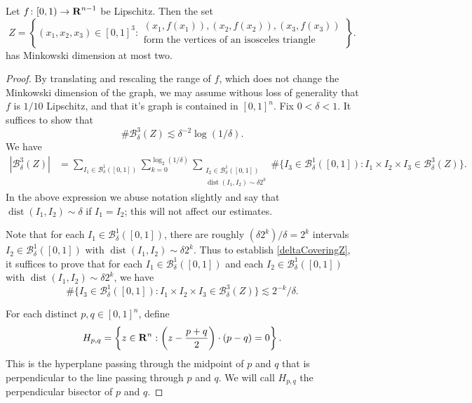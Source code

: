 \begin{lemma}
	Let $f\colon [0,1) \to \operatorname{\mathbf{R}}^{n-1}$ be Lipschitz. Then the set
	\[ Z = \left\{ (x_1,x_2,x_3) \in [0,1]^3 : \begin{array}{c} (x_1,f(x_1)), (x_2,f(x_2)), (x_3,f(x_3))\\
		\textrm{form the vertices of an isosceles triangle} \end{array} \right\}. \]
	has Minkowski dimension at most two.
\end{lemma}
\begin{proof}
By translating and rescaling the range of $f$, which does not change the Minkowski dimension of the graph, we may assume withous loss of generality that $f$ is $1/10$ Lipschitz, and that it's graph is contained in $[0,1]^n$. Fix $0<\delta<1$. It suffices to show that
	\begin{equation}\label{deltaCoveringZ}
		\# \mathcal{B}_{\delta}^{3}(Z)\lesssim\delta^{-2}\log(1/\delta).
	\end{equation}
	We have
	\begin{align*}
		|\mathcal{B}_{\delta}^{3}(Z)| &= \sum_{I_1 \in \mathcal{B}_{\delta}^1([0,1])} \sum_{k=0}^{\log_2(1/\delta)} \sum_{\substack{I_2 \in \mathcal{B}_{\delta}^1([0,1]) \\ \operatorname{dist}(I_1,I_2)\sim \delta 2^k }} \#\{ I_3\in \mathcal{B}_{\delta}^1([0,1]) : I_1\times I_2\times I_3\in \mathcal{B}_{\delta}^{3}(Z) \}.
	\end{align*}
	In the above expression we abuse notation slightly and say that $\operatorname{dist}(I_1,I_2)\sim \delta$ if $I_1=I_2$; this will not affect our estimates.

Note that for each $I_1 \in \mathcal{B}_{\delta}^1([0,1])$, there are roughly $(\delta 2^k)/\delta=2^k$ intervals $I_2\in  \mathcal{B}_{\delta}^1([0,1])$ with $\operatorname{dist}(I_1,I_2)\sim \delta 2^k$. Thus to establish \eqref{deltaCoveringZ}, it suffices to prove that for each $I_1 \in \mathcal{B}_{\delta}^1([0,1])$ and each $I_2\in  \mathcal{B}_{\delta}^1([0,1])$ with $\operatorname{dist}(I_1,I_2)\sim \delta 2^k$, we have
\begin{equation}\label{numberOfI3}
\#\{ I_3\in \mathcal{B}_{\delta}^1([0,1]) : I_1\times I_2\times I_3\in \mathcal{B}_{\delta}^{3}(Z) \}\lesssim 2^{-k}/\delta.
\end{equation}

For each distinct $p,q\in [0,1]^n$, define 
%
\[ H_{p,q}= \left\{z\in \operatorname{\mathbf{R}}^n : \left(z-\frac{p+q}{2}\right)\cdot (p-q)=0  \right\}. \]
%
This is the hyperplane passing through the midpoint of $p$ and $q$ that is perpendicular to the line passing through $p$ and $q$. We will call $H_{p,q}$ the perpendicular bisector of $p$ and $q$.


\end{proof}
